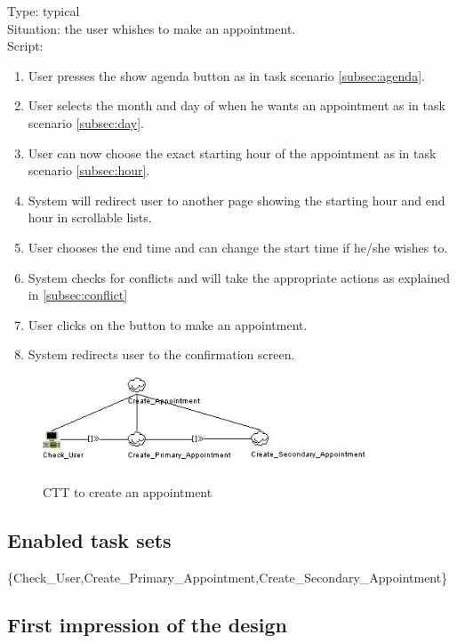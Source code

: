 \documentclass[11pt, a4paper,svglistings]{report}
\begin{document}
\label{subsec:appointment}Type: typical \\
Situation: the user whishes to make an appointment. \\
Script:
\begin{enumerate}
\item User presses the show agenda button as in task scenario \ref{subsec:agenda}.
\item User selects the month and day of when he wants an appointment as in task scenario \ref{subsec:day}.
\item User can now choose the exact starting hour of the appointment as in task scenario \ref{subsec:hour}.
\item System will redirect user to another page showing the starting hour and end hour in scrollable lists.
\item User chooses the end time and can change the start time if he/she wishes to.
\item System checks for conflicts and will take the appropriate actions as explained in \ref{subsec:conflict}
\item User clicks on the button to make an appointment.
\item System redirects user to the confirmation screen.
\end{enumerate}

\begin{figure}[H]
\centering
    \includegraphics[width=0.9\textwidth]{CreateAppointment.jpg}
  \caption[Create appointment CTT]{\label{fig:CreateAppointment}CTT to create an appointment}
\end{figure}

\subsection{Enabled task sets}

\{Check\_User,Create\_Primary\_Appointment,Create\_Secondary\_Appointment\}

\subsection{First impression of the design}
\end{document}
